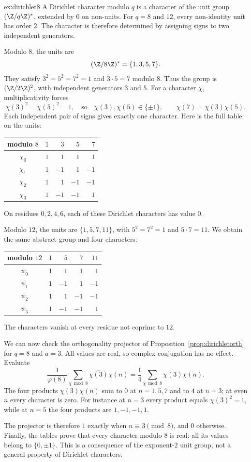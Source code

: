 \begin{solution}{ex:dirichlet8}
\idea A Dirichlet character modulo $q$ is a character of the unit group $(\Z/q\Z)^*$, extended by $0$ on non-units. For $q=8$ and $12$, every non-identity unit has order $2$. The character is therefore determined by assigning signs to two independent generators.

\writeup Modulo $8$, the units are
\[
(\Z/8\Z)^*=\{1,3,5,7\}.
\]
They satisfy $3^2=5^2=7^2=1$ and $3\cdot5=7$ modulo $8$. Thus the group is $(\Z/2\Z)^2$, with independent generators $3$ and $5$. For a character $\chi$, multiplicativity forces
\[
\chi(3)^2=\chi(5)^2=1,
\quad\text{so}\quad \chi(3),\chi(5)\in\{\pm1\},
\qquad\chi(7)=\chi(3)\chi(5).
\]
Each independent pair of signs gives exactly one character. Here is the full table on the units:
\begin{center}
\small
\begin{tabular}{c|rrrr}
modulo $8$ & $1$ & $3$ & $5$ & $7$\\\hline
$\chi_0$ & $1$ & $1$ & $1$ & $1$\\
$\chi_1$ & $1$ & $-1$ & $1$ & $-1$\\
$\chi_2$ & $1$ & $1$ & $-1$ & $-1$\\
$\chi_3$ & $1$ & $-1$ & $-1$ & $1$
\end{tabular}
\end{center}
On residues $0,2,4,6$, each of these Dirichlet characters has value $0$.

Modulo $12$, the units are $\{1,5,7,11\}$, with $5^2=7^2=1$ and $5\cdot7=11$. We obtain the same abstract group and four characters:
\begin{center}
\small
\begin{tabular}{c|rrrr}
modulo $12$ & $1$ & $5$ & $7$ & $11$\\\hline
$\psi_0$ & $1$ & $1$ & $1$ & $1$\\
$\psi_1$ & $1$ & $-1$ & $1$ & $-1$\\
$\psi_2$ & $1$ & $1$ & $-1$ & $-1$\\
$\psi_3$ & $1$ & $-1$ & $-1$ & $1$
\end{tabular}
\end{center}
The characters vanish at every residue not coprime to $12$.

We can now check the orthogonality projector of Proposition~\ref{prop:dirichletorth} for $q=8$ and $a=3$. All values are real, so complex conjugation has no effect. Evaluate
\[
\frac1{\varphi(8)}\sum_{\chi\bmod8}\overline{\chi(3)}\chi(n)
=\frac14\sum_{\chi\bmod8}\chi(3)\chi(n).
\]
The four products $\chi(3)\chi(n)$ sum to $0$ at $n=1,5,7$ and to $4$ at $n=3$; at even $n$ every character is zero. For instance at $n=3$ every product equals $\chi(3)^2=1$, while at $n=5$ the four products are $1,-1,-1,1$.

The projector is therefore $1$ exactly when $n\equiv3\pmod8$, and $0$ otherwise. Finally, the tables prove that every character modulo $8$ is real: all its values belong to $\{0,\pm1\}$. This is a consequence of the exponent-$2$ unit group, not a general property of Dirichlet characters.
\end{solution}

